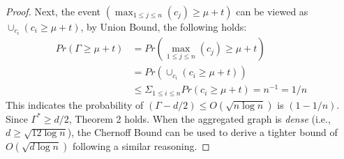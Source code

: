 \begin{proof}
Next, the event $(\max_{1 \leq j \leq n}(c_j) \geq \mu + t)$ can be viewed as
$\cup_{c_i} (c_i \geq \mu + t )$, by Union Bound, the following holds:
\begin{equation*}
\begin{split}
	Pr(\Gamma \geq \mu + t) &=Pr(\max_{1\leq j \leq n}(c_j) \geq \mu + t) \\ &= Pr(\cup_{c_i} (c_i \geq \mu + t )) \\
		&\leq \Sigma_{1 \leq i \leq n} Pr(c_i \geq \mu + t) = n^{-1} = 1/n
\end{split}
\end{equation*}
This indicates the probability of $(\Gamma-d/2) \leq O(\sqrt{n\log n})$ is $(1-1/n)$. 
Since $\Gamma^* \geq d/2$, Theorem 2 holds.
When the aggregated graph is \emph{dense} (i.e., $d\geq \sqrt{12 \log n}$),
the Chernoff Bound can be used to derive a tighter bound of 
$O(\sqrt{d\log n}) $ following a similar reasoning.
\end{proof}


